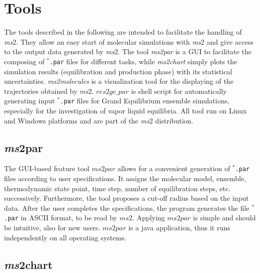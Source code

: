 



\chapter{Tools}
\label{sec:Tools}

The tools described in the following are intended to facilitate the handling of \textit{ms}2. They allow an easy start of molecular simulations with \textit{ms}2 and give access to the output data generated by \textit{ms}2. The tool \textit{ms2par} is a GUI to facilitate the composing of \texttt{$^{*}$\hspace{-3pt}.par} files for different tasks, while \textit{ms2chart} simply plots the simulation results (equilibration and production phase) with its statistical uncertainties. \textit{ms2molecules} is a visualization tool for the displaying of the trajectories obtained by \textit{ms}2. $res2ge\_par$ is shell script for automatically generating input \texttt{$^{*}$\hspace{-3pt}.par} files for Grand Equilibrium ensemble simulations, especially for the investigation of vapor liquid equilibria. All tool run on Linux and Windows platforms and are part of the \textit{ms}2 distribution. 


\section{\textit{ms}2par}
\label{sec:ms2par}


The GUI-based feature tool $ms2par$ allows for a convenient generation of \texttt{$^{*}$\hspace{-3pt}.par} files according to user specifications. It assigns the molecular model, ensemble, thermodynamic state point, time step, number of equilibration steps, etc. successively. Furthermore, the tool proposes a cut-off radius based on the input data. After the user completes the specifications, the program generates the file \texttt{$^{*}$\hspace{-3pt}.par} in ASCII format, to be read by $ms2$. Applying $ms2par$ is simple and should be intuitive, also for new users. $ms2par$ is a java application, thus it runs independently on all operating systems. 


\section{\textit{ms}2chart}
\label{sec:ms2chart}


